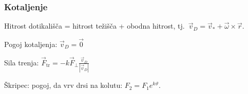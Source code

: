 \documentclass[a4paper,10pt]{article}
\theoremstyle{definition}
\let\theta\vartheta
\begin{document}
\subsubsection*{Kotaljenje}
Hitrost dotikališča = hitrost težišča + obodna hitrost, tj.\ $\vec{v}_D = \vec{v}_* + \vec{\omega} \times \vec{r}$.

Pogoj kotaljenja: $\vec{v}_D = \vec{0}$

Sila trenja: $\vec{F}_{\operatorname{tr}} = - k \vec{F}_{\perp} \frac{\vec{v}_D}{|\vec{v}_D|}$

Škripec: pogoj, da vrv drsi na kolutu: $F_2 = F_1 e^{k \theta}$.
\end{document}
